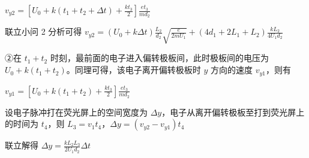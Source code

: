 \documentclass[\gkver]{gaokaozhenti}
\begin{document}
\begin{enumerate}
{$v_{y2} = \left[U_{0} + k(t_{1} + t_{2} + \Delta t) + \frac{kt_{3}}{2}\right]\frac{et_{3}}{md_{2}}$

联立小问 2 分析可得 $v_{y2} = (U_{0} + k\Delta t)\frac{L_{2}}{d_{2}}\sqrt{\frac{e}{2mU_{1}}} + (4d_{1} + 2L_{1} + L_{2})\frac{kL_{2}}{4U_{1}d_{2}}$

②在 $t_{1} + t_{2}$ 时刻，最前面的电子进入偏转极板间，此时极板间的电压为 $U_{0} + k(t_{1} + t_{2})$。同理可得，该电子离开偏转极板时 $y$ 方向的速度 $v_{y1}$，则有

$v_{y1} = \left[U_{0} + k(t_{1} + t_{2}) + \frac{kt_{3}}{2}\right]\frac{et_{3}}{md_{2}}$

设电子脉冲打在荧光屏上的空间宽度为 $\Delta y$，电子从离开偏转极板至打到荧光屏上的时间为 $t_{4}$，则 $L_{3} = v_{1}t_{4}$，$\Delta y = (v_{y2} - v_{y1})t_{4}$

联立解得 $\Delta y = \frac{kL_{2}L_{3}}{2U_{1}d_{2}}\Delta t$
}

\end{enumerate}
\end{document}
